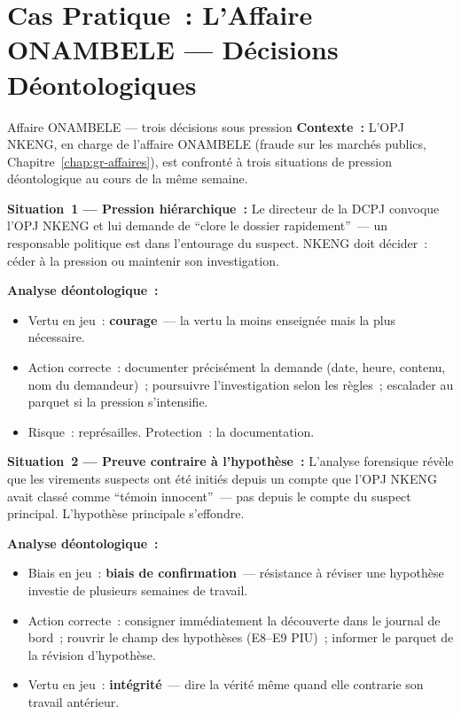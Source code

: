 \section{Cas Pratique~: L'Affaire ONAMBELE --- Décisions Déontologiques}
\label{sec:deon-onambele}

\begin{boxscenario}{Affaire ONAMBELE --- trois décisions sous pression}
\textbf{Contexte~:} L'OPJ NKENG, en charge de l'affaire ONAMBELE (fraude
sur les marchés publics, Chapitre~\ref{chap:gr-affaires}), est confronté
à trois situations de pression déontologique au cours de la même semaine.

\textbf{Situation~1 --- Pression hiérarchique~:}
Le directeur de la DCPJ convoque l'OPJ NKENG et lui demande de ``clore
le dossier rapidement''~--- un responsable politique est dans l'entourage
du suspect. NKENG doit décider~: céder à la pression ou maintenir son
investigation.

\textbf{Analyse déontologique~:}
\begin{itemize}
    \item Vertu en jeu~: \textbf{courage}~--- la vertu la moins
          enseignée mais la plus nécessaire.
    \item Action correcte~: documenter précisément la demande (date,
          heure, contenu, nom du demandeur)~; poursuivre l'investigation
          selon les règles~; escalader au parquet si la pression s'intensifie.
    \item Risque~: représailles. Protection~: la documentation.
\end{itemize}

\textbf{Situation~2 --- Preuve contraire à l'hypothèse~:}
L'analyse forensique révèle que les virements suspects ont été initiés
depuis un compte que l'OPJ NKENG avait classé comme ``témoin innocent''~---
pas depuis le compte du suspect principal. L'hypothèse principale s'effondre.

\textbf{Analyse déontologique~:}
\begin{itemize}
    \item Biais en jeu~: \textbf{biais de confirmation}~--- résistance
          à réviser une hypothèse investie de plusieurs semaines de travail.
    \item Action correcte~: consigner immédiatement la découverte dans
          le journal de bord~; rouvrir le champ des hypothèses (E8--E9
          PIU)~; informer le parquet de la révision d'hypothèse.
    \item Vertu en jeu~: \textbf{intégrité}~--- dire la vérité même
          quand elle contrarie son travail antérieur.
\end{itemize}


\end{boxscenario}

